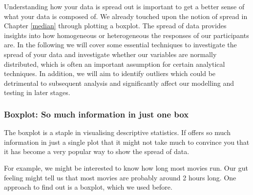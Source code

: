 \documentclass[
]{book}
\begin{document}
Understanding how your data is spread out is important to get a better sense of what your data is composed of. We already touched upon the notion of spread in Chapter \ref{median} through plotting a boxplot. The spread of data provides insights into how homogeneous or heterogeneous the responses of our participants are. In the following we will cover some essential techniques to investigate the spread of your data and investigate whether our variables are normally distributed, which is often an important assumption for certain analytical techniques. In addition, we will aim to identify outliers which could be detrimental to subsequent analysis and significantly affect our modelling and testing in later stages.

\hypertarget{boxplot-so-much-information-in-just-one-box}{%
\subsubsection{Boxplot: So much information in just one box}\label{boxplot-so-much-information-in-just-one-box}}

The boxplot is a staple in visualising descriptive statistics. If offers so much information in just a single plot that it might not take much to convince you that it has become a very popular way to show the spread of data.

For example, we might be interested to know how long most movies run. Our gut feeling might tell us that most movies are probably around 2 hours long. One approach to find out is a boxplot, which we used before.
\end{document}
